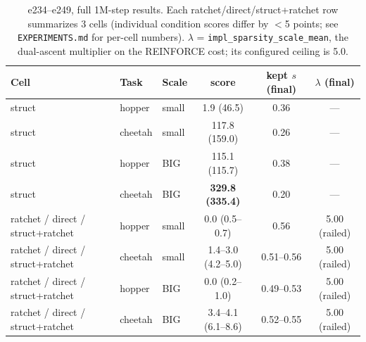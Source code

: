 \documentclass[10pt]{article}
\begin{document}
\begin{table}[h]
\centering\small
\begin{tabular}{lllccc}
\toprule
Cell & Task & Scale & score & kept $s$ (final) & $\lambda$ (final) \\
\midrule
struct & hopper & small & 1.9 (46.5) & 0.36 & --- \\
struct & cheetah & small & 117.8 (159.0) & 0.26 & --- \\
struct & hopper & BIG & 115.1 (115.7) & 0.38 & --- \\
struct & cheetah & BIG & \textbf{329.8 (335.4)} & 0.20 & --- \\
\addlinespace
ratchet / direct / struct+ratchet & hopper & small & 0.0 (0.5--0.7) & 0.56 & 5.00 (railed) \\
ratchet / direct / struct+ratchet & cheetah & small & 1.4--3.0 (4.2--5.0) & 0.51--0.56 & 5.00 (railed) \\
ratchet / direct / struct+ratchet & hopper & BIG & 0.0 (0.2--1.0) & 0.49--0.53 & 5.00 (railed) \\
ratchet / direct / struct+ratchet & cheetah & BIG & 3.4--4.1 (6.1--8.6) & 0.52--0.55 & 5.00 (railed) \\
\bottomrule
\end{tabular}
\caption{e234--e249, full 1M-step results. Each ratchet/direct/struct+ratchet
row summarizes 3 cells (individual condition scores differ by
$<$5 points; see \texttt{EXPERIMENTS.md} for per-cell numbers). $\lambda$ =
\texttt{impl\_sparsity\_scale\_mean}, the dual-ascent multiplier on the
REINFORCE cost; its configured ceiling is 5.0.}
\label{tab:implresults}
\end{table}
\end{document}
